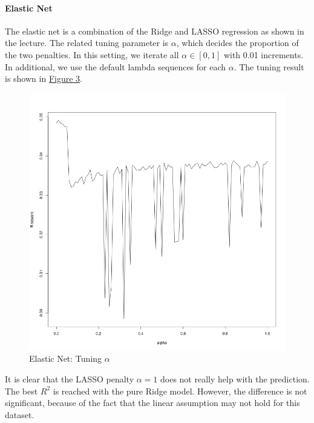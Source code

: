 \documentclass[8pt]{article}
\begin{document}
\paragraph{Elastic Net}
The elastic net is a combination of the Ridge and LASSO regression as shown in the lecture. 
The related tuning parameter is $\alpha$, which decides the proportion of the two penalties. 
In this setting, we iterate all $\alpha \in [0, 1]$ with 0.01 increments. 
In additional, we use the default lambda sequences for each $\alpha$. 
The tuning result is shown in \hyperref[fig:elastic_net]{Figure 3}.
\begin{figure}[H]
    \centering
    \includegraphics*[scale=0.25]{figures/elastic_net.png}
    \caption{Elastic Net: Tuning $\alpha$}
    \label{fig:elastic_net}
\end{figure}
It is clear that the LASSO penalty $\alpha = 1$ does not really help with the prediction.
The best $R^2$ is reached with the pure Ridge model. However, the difference is not significant, 
because of the fact that the linear assumption may not hold for this dataset.
\end{document}
